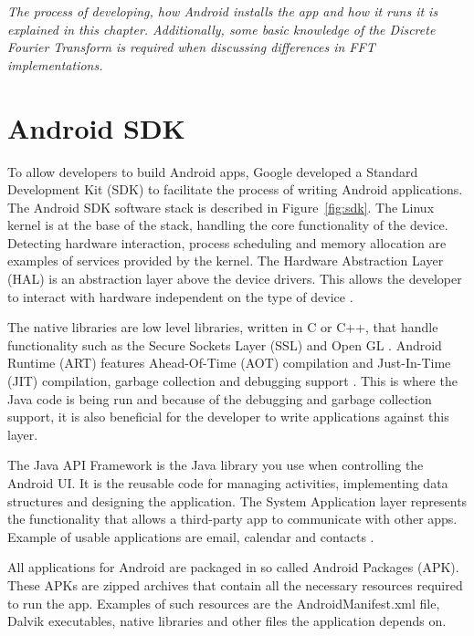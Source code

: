 \textit{The process of developing, how Android installs the app and how it runs it is explained in this chapter. Additionally, some basic knowledge of the Discrete Fourier Transform is required when discussing differences in FFT implementations.}

\section{Android SDK}
To allow developers to build Android apps, Google developed a Standard Development Kit (SDK) to facilitate the process of writing Android applications. The Android SDK software stack is described in Figure~\ref{fig:sdk}. The Linux kernel is at the base of the stack, handling the core functionality of the device. Detecting hardware interaction, process scheduling and memory allocation are examples of services provided by the kernel. The Hardware Abstraction Layer (HAL) is an abstraction layer above the device drivers. This allows the developer to interact with hardware independent on the type of device \cite{android:hal}.

The native libraries are low level libraries, written in C or C++, that handle functionality such as the Secure Sockets Layer (SSL) and Open GL \cite{komatineni2012pro}. Android Runtime (ART) features Ahead-Of-Time (AOT) compilation and Just-In-Time (JIT) compilation, garbage collection and debugging support \cite{android:sdk:stack}. This is where the Java code is being run and because of the debugging and garbage collection support, it is also beneficial for the developer to write applications against this layer.

The Java API Framework is the Java library you use when controlling the Android UI. It is the reusable code for managing activities, implementing data structures and designing the application. The System Application layer represents the functionality that allows a third-party app to communicate with other apps. Example of usable applications are email, calendar and contacts \cite{android:sdk:stack}.

All applications for Android are packaged in so called Android Packages (APK). These APKs are zipped archives that contain all the necessary resources required to run the app. Examples of such resources are the AndroidManifest.xml file, Dalvik executables, native libraries and other files the application depends on.

